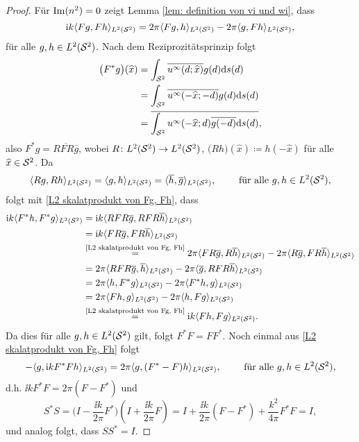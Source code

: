\begin{proof}
	Für \(\operatorname{Im}(n^2)=0\) zeigt Lemma \ref{lem: definition von vi und wi}, dass
	\begin{equation}
		\label{L2 skalatprodukt von Fg, Fh}
		\mathrm{i} k\langle Fg, Fh\rangle_{L^2(\mathcal{S}^2)} = 2\pi\langle Fg, h\rangle_{L^2(\mathcal{S}^2)} - 2\pi\langle g, Fh\rangle_{L^2(\mathcal{S}^2)},
	\end{equation}
	für alle \(g,h\in L^2(\mathcal{S}^2)\). Nach dem Reziprozitätsprinzip folgt
	\begin{align*}
		\big(F^\ast g\big)(\widehat{x})
		&=\int_{\mathcal{S}^2}\overline{u^\infty(d;\widehat{x})}g(d)\mathrm{d}s(d)\\
		&=\int_{\mathcal{S}^2}\overline{u^\infty(-\widehat{x};-d)}g(d)\mathrm{d}s(d)\\
		&=\overline{\int_{\mathcal{S}^2}u^\infty(-\widehat{x};d)\overline{g(-d)}\mathrm{d}s(d)},
	\end{align*}
	also \(F^\ast g=\overline{RFR\overline{g}}\), wobei \(R\colon L^2(\mathcal{S}^2) \to L^2(\mathcal{S}^2)\), \(\big(Rh\big)(\widehat{x})\coloneqq h(-\widehat{x})\) für alle \(\widehat{x}\in\mathcal{S}^2\). Da
	\begin{equation*}
		\langle Rg, Rh\rangle_{L^2(\mathcal{S}^2)}=\langle g, h\rangle_{L^2(\mathcal{S}^2)}=\langle \overline{h}, \overline{g}\rangle_{L^2(\mathcal{S}^2)},\qquad\text{ für alle }g,h\in L^2(\mathcal{S}^2),
	\end{equation*}
	folgt mit \eqref{L2 skalatprodukt von Fg, Fh}, dass
	\begin{align*}
		\mathrm{i} k\langle F^\ast h, F^\ast g\rangle_{L^2(\mathcal{S}^2)}
		&=\mathrm{i} k\langle RFR\overline{g}, RFR\overline{h}\rangle_{L^2(\mathcal{S}^2)}\\
		&=\mathrm{i} k\langle FR\overline{g}, FR\overline{h}\rangle_{L^2(\mathcal{S}^2)}\\
		&\overset{\scriptsize\eqref{L2 skalatprodukt von Fg, Fh}}{=}2\pi\langle FR\overline{g}, R\overline{h}\rangle_{L^2(\mathcal{S}^2)} - 2\pi\langle R\overline{g}, FR\overline{h}\rangle_{L^2(\mathcal{S}^2)}\\
		&=2\pi\langle RFR\overline{g}, \overline{h}\rangle_{L^2(\mathcal{S}^2)} - 2\pi\langle \overline{g}, RFR\overline{h}\rangle_{L^2(\mathcal{S}^2)}\\
		&=2\pi\langle h, F^\ast g\rangle_{L^2(\mathcal{S}^2)} - 2\pi\langle F^\ast h, g\rangle_{L^2(\mathcal{S}^2)}\\
		&=2\pi\langle Fh, g\rangle_{L^2(\mathcal{S}^2)} - 2\pi\langle h, Fg\rangle_{L^2(\mathcal{S}^2)}\\
		&\overset{\scriptsize\eqref{L2 skalatprodukt von Fg, Fh}}{=} \mathrm{i} k\langle Fh, Fg\rangle_{L^2(\mathcal{S}^2)}.
	\end{align*}
	Da dies für alle \(g,h\in L^2(\mathcal{S}^2)\) gilt, folgt \(F^\ast F=FF^\ast\). Noch einmal aus \eqref{L2 skalatprodukt von Fg, Fh} folgt
	\begin{equation*}
		-\langle g, \mathrm{i} kF^\ast Fh\rangle_{L^2(\mathcal{S}^2)} = 2\pi\langle g, (F^\ast -F)h\rangle_{L^2(\mathcal{S}^2)},\qquad\text{ für alle }g,h\in L^2(\mathcal{S}^2),
	\end{equation*}
	d.h. \(\ii kF^\ast F=2\pi(F-F^\ast)\) und
	\begin{equation*}
		S^\ast S=\big(I-\frac{\ii k}{2\pi}F^\ast\big)(I+\frac{\ii k}{2\pi}F)=I+\frac{\ii k}{2\pi}(F-F^\ast)+\frac{k^2}{4\pi}F^\ast F=I,
	\end{equation*}
	und analog folgt, dass \(SS^\ast=I\).
\end{proof}
